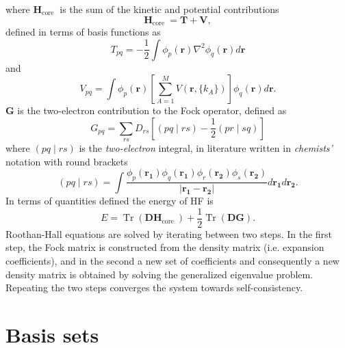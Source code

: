 \documentclass[final,3p,times,twocolumn]{elsarticle}
\begin{document}
	where $\mathbf{H}_{\text {core }}$ is the sum of the kinetic and potential contributions
	\begin{equation}
		\mathbf{H}_{\text {core }}=\mathbf{T}+\mathbf{V}, 
	\end{equation}
	defined in terms of basis functions as
	\begin{equation}
		T_{p q}=-\frac{1}{2} \int \phi_{p}(\mathbf{r}) \nabla^{2} \phi_{q}(\mathbf{r}) d \mathbf{r}
	\end{equation}
	and
	\begin{equation}
		V_{p q}=\int \phi_{p}(\mathbf{r})
		\left[\sum_{A=1}^{M} 
		V(\mathbf r, \{k_A\})
		\right] \phi_{q}(\mathbf{r}) d \mathbf{r}. 
	\end{equation}
	$\mathbf{G}$ is the two-electron contribution to the Fock operator, defined as
	\begin{equation}
		G_{p q}=\sum_{r s} D_{r s}\left[(p q \mid r s)-\frac{1}{2}(p r \mid s q)\right]
	\end{equation}
	where $(p q \mid r s)$ is the \emph{two-electron} integral, in literature written in \emph{chemists'} notation with round brackets
	\begin{equation}
		(p q \mid r s)=
		\int \frac{
			\phi_{p}\left(\mathbf{r}_{\mathbf{1}}\right) \phi_{q}\left(\mathbf{r}_{\mathbf{1}}\right) \phi_{r}\left(\mathbf{r}_{\mathbf{2}}\right) \phi_{s}\left(\mathbf{r}_{\mathbf{2}}\right)}{\left|\mathbf{r}_{\mathbf{1}}-\mathbf{r}_{\mathbf{2}}\right|} d \mathbf{r}_{\mathbf{1}} d \mathbf{r}_{\mathbf{2}}.
	\end{equation}
	In terms of quantities defined the energy of HF is
	\begin{equation}
		E=\operatorname{Tr}\left(\mathbf{D H}_{\text {core }}\right)+\frac{1}{2} \operatorname{Tr}(\mathbf{D G}).
	\end{equation}
	Roothan-Hall equations are solved by iterating between two steps. In the first step, the Fock matrix is constructed from the density matrix (i.e. expansion coefficients), and in the second a new set of coefficients and consequently a new density matrix is obtained by solving the generalized eigenvalue problem. Repeating the two steps converges the system towards self-consistency.

	\section{Basis sets}
	\label{app:basissets}
\end{document}
